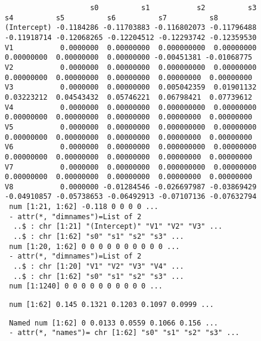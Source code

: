 \documentclass[
]{article}
\begin{document}
\begin{verbatim}
                    s0          s1           s2          s3          s4          s5          s6          s7          s8
(Intercept) -0.1184286 -0.11703883 -0.116802073 -0.11796488 -0.11918714 -0.12068265 -0.12204512 -0.12293742 -0.12359530
V1           0.0000000  0.00000000  0.000000000  0.00000000  0.00000000  0.00000000  0.00000000 -0.00451381 -0.01068775
V2           0.0000000  0.00000000  0.000000000  0.00000000  0.00000000  0.00000000  0.00000000  0.00000000  0.00000000
V3           0.0000000  0.00000000  0.005042359  0.01901132  0.03223212  0.04543432  0.05746221  0.06798421  0.07739612
V4           0.0000000  0.00000000  0.000000000  0.00000000  0.00000000  0.00000000  0.00000000  0.00000000  0.00000000
V5           0.0000000  0.00000000  0.000000000  0.00000000  0.00000000  0.00000000  0.00000000  0.00000000  0.00000000
V6           0.0000000  0.00000000  0.000000000  0.00000000  0.00000000  0.00000000  0.00000000  0.00000000  0.00000000
V7           0.0000000  0.00000000  0.000000000  0.00000000  0.00000000  0.00000000  0.00000000  0.00000000  0.00000000
V8           0.0000000 -0.01284546 -0.026697987 -0.03869429 -0.04910857 -0.05738653 -0.06492913 -0.07107136 -0.07632794
 num [1:21, 1:62] -0.118 0 0 0 0 ...
 - attr(*, "dimnames")=List of 2
  ..$ : chr [1:21] "(Intercept)" "V1" "V2" "V3" ...
  ..$ : chr [1:62] "s0" "s1" "s2" "s3" ...
 num [1:20, 1:62] 0 0 0 0 0 0 0 0 0 0 ...
 - attr(*, "dimnames")=List of 2
  ..$ : chr [1:20] "V1" "V2" "V3" "V4" ...
  ..$ : chr [1:62] "s0" "s1" "s2" "s3" ...
 num [1:1240] 0 0 0 0 0 0 0 0 0 0 ...
\end{verbatim}

\begin{verbatim}
 num [1:62] 0.145 0.1321 0.1203 0.1097 0.0999 ...
\end{verbatim}

\begin{verbatim}
 Named num [1:62] 0 0.0133 0.0559 0.1066 0.156 ...
 - attr(*, "names")= chr [1:62] "s0" "s1" "s2" "s3" ...
\end{verbatim}
\end{document}
